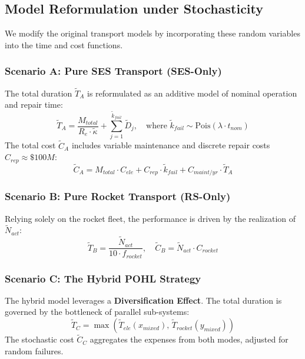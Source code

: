 \documentclass{mcmthesis}
\begin{document}
\subsection{Model Reformulation under Stochasticity}

We modify the original transport models by incorporating these random variables into the time and cost functions.

\subsubsection{Scenario A: Pure SES Transport (SES-Only)}
The total duration $\tilde{T}_A$ is reformulated as an additive model of nominal operation and repair time:
\begin{equation}
	\tilde{T}_{A} = \frac{M_{total}}{R_e \cdot \tilde{\kappa}} + \sum_{j=1}^{\tilde{k}_{fail}} \tilde{D}_j, \quad \text{where } \tilde{k}_{fail} \sim \mathrm{Pois}(\lambda \cdot t_{nom})
\end{equation}
The total cost $\tilde{C}_A$ includes variable maintenance and discrete repair costs $C_{rep} \approx \$100M$:
\begin{equation}
	\tilde{C}_{A} = M_{total} \cdot C_{ele} + C_{rep} \cdot \tilde{k}_{fail} + C_{maint/yr} \cdot \tilde{T}_{A}
\end{equation}

\subsubsection{Scenario B: Pure Rocket Transport (RS-Only)}
Relying solely on the rocket fleet, the performance is driven by the realization of $\tilde{N}_{act}$:
\begin{equation}
	\tilde{T}_{B} = \frac{\tilde{N}_{act}}{10 \cdot f_{rocket}}, \quad \tilde{C}_{B} = \tilde{N}_{act} \cdot C_{rocket}
\end{equation}

\subsubsection{Scenario C: The Hybrid POHL Strategy}
The hybrid model leverages a \textbf{Diversification Effect}. The total duration is governed by the bottleneck of parallel sub-systems:
\begin{equation}
	\tilde{T}_{C} = \max \left( \tilde{T}_{ele}(x_{mixed}), \, \tilde{T}_{rocket}(y_{mixed}) \right)
\end{equation}
The stochastic cost $\tilde{C}_C$ aggregates the expenses from both modes, adjusted for random failures.
\end{document}
